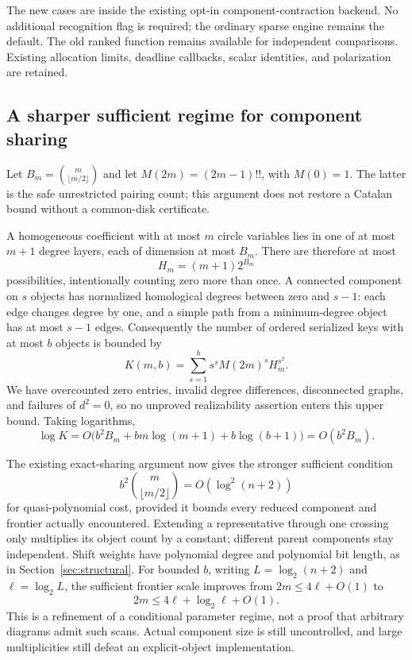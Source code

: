 The new cases are inside the existing opt-in component-contraction
backend. No additional recognition flag is required; the ordinary
sparse engine remains the default. The old ranked function remains
available for independent comparisons. Existing allocation limits,
deadline callbacks, scalar identities, and polarization are retained.

\subsection{A sharper sufficient regime for component sharing}
Let $B_m=\binom{m}{\lfloor m/2\rfloor}$ and let
$M(2m)=(2m-1)!!$, with $M(0)=1$. The latter is the safe unrestricted
pairing count; this argument does not restore a Catalan bound without
a common-disk certificate.

A homogeneous coefficient with at most $m$ circle variables lies
in one of at most $m+1$ degree layers, each of dimension at most
$B_m$. There are therefore at most
\[
 H_m=(m+1)2^{B_m}
\]
possibilities, intentionally counting zero more than once. A connected
component on $s$ objects has normalized homological degrees between
zero and $s-1$: each edge changes degree by one, and a simple path
from a minimum-degree object has at most $s-1$ edges. Consequently
the number of ordered serialized keys with at most $b$ objects is
bounded by
\[
 K(m,b)=\sum_{s=1}^b s^s M(2m)^s H_m^{s^2}.
\]
We have overcounted zero entries, invalid degree differences,
disconnected graphs, and failures of $d^2=0$, so no unproved
realizability assertion enters this upper bound. Taking logarithms,
\[
 \log K=O\bigl(b^2B_m+bm\log(m+1)+b\log(b+1)\bigr)
       =O(b^2B_m).
\]

The existing exact-sharing argument now gives the stronger sufficient
condition
\[
 b^2\binom{m}{\lfloor m/2\rfloor}=O(\log^2(n+2))
\]
for quasi-polynomial cost, provided it bounds every reduced component
and frontier actually encountered. Extending a representative through
one crossing only multiplies its object count by a constant; different
parent components stay independent. Shift weights have polynomial
degree and polynomial bit length, as in Section~\ref{sec:structural}.
For bounded $b$, writing $L=\log_2(n+2)$ and $\ell=\log_2 L$, the
sufficient frontier scale improves from $2m\le4\ell+O(1)$ to
\[
 2m\le4\ell+\log_2\ell+O(1).
\]
This is a refinement of a conditional parameter regime, not a proof
that arbitrary diagrams admit such scans. Actual component size is
still uncontrolled, and large multiplicities still defeat an
explicit-object implementation.

